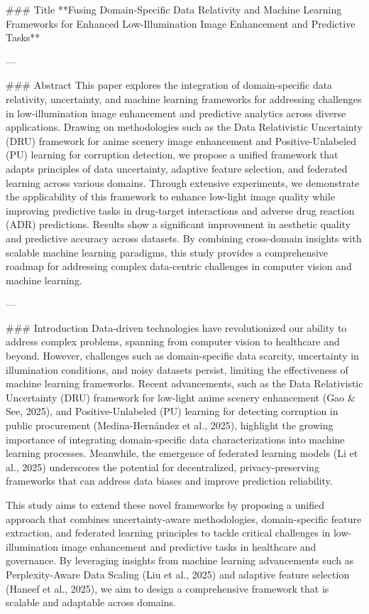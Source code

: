 ### Title
**Fusing Domain-Specific Data Relativity and Machine Learning Frameworks for Enhanced Low-Illumination Image Enhancement and Predictive Tasks**

---

### Abstract
This paper explores the integration of domain-specific data relativity, uncertainty, and machine learning frameworks for addressing challenges in low-illumination image enhancement and predictive analytics across diverse applications. Drawing on methodologies such as the Data Relativistic Uncertainty (DRU) framework for anime scenery image enhancement and Positive-Unlabeled (PU) learning for corruption detection, we propose a unified framework that adapts principles of data uncertainty, adaptive feature selection, and federated learning across various domains. Through extensive experiments, we demonstrate the applicability of this framework to enhance low-light image quality while improving predictive tasks in drug-target interactions and adverse drug reaction (ADR) predictions. Results show a significant improvement in aesthetic quality and predictive accuracy across datasets. By combining cross-domain insights with scalable machine learning paradigms, this study provides a comprehensive roadmap for addressing complex data-centric challenges in computer vision and machine learning.

---

### Introduction
Data-driven technologies have revolutionized our ability to address complex problems, spanning from computer vision to healthcare and beyond. However, challenges such as domain-specific data scarcity, uncertainty in illumination conditions, and noisy datasets persist, limiting the effectiveness of machine learning frameworks. Recent advancements, such as the Data Relativistic Uncertainty (DRU) framework for low-light anime scenery enhancement (Gao & See, 2025), and Positive-Unlabeled (PU) learning for detecting corruption in public procurement (Medina-Hernández et al., 2025), highlight the growing importance of integrating domain-specific data characterizations into machine learning processes. Meanwhile, the emergence of federated learning models (Li et al., 2025) underscores the potential for decentralized, privacy-preserving frameworks that can address data biases and improve prediction reliability.

This study aims to extend these novel frameworks by proposing a unified approach that combines uncertainty-aware methodologies, domain-specific feature extraction, and federated learning principles to tackle critical challenges in low-illumination image enhancement and predictive tasks in healthcare and governance. By leveraging insights from machine learning advancements such as Perplexity-Aware Data Scaling (Liu et al., 2025) and adaptive feature selection (Haneef et al., 2025), we aim to design a comprehensive framework that is scalable and adaptable across domains.

